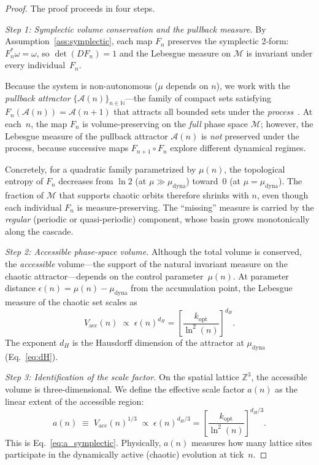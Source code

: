 \documentclass[twocolumn,showpacs,preprintnumbers,amsmath,amssymb,prd]{revtex4-2}
\newcommand{\lnq}{\ln^2}
\newcommand{\ZZ}{\mathbb{Z}}
\newcommand{\NN}{\mathbb{N}}
\begin{document}
\begin{proof}
The proof proceeds in four steps.

\emph{Step 1: Symplectic volume conservation and the pullback measure.}
By Assumption~\ref{ass:symplectic}, each map $F_n$
preserves the symplectic 2-form: $F_n^*\omega = \omega$,
so $\det(DF_n) = 1$ and the Lebesgue measure on $\mathcal{M}$
is invariant under every individual~$F_n$.

Because the system is non-autonomous ($\mu$ depends on $n$),
we work with the \emph{pullback attractor}
$\{\mathcal{A}(n)\}_{n\in\NN}$---the family of compact sets
satisfying $F_n(\mathcal{A}(n)) = \mathcal{A}(n+1)$
that attracts all bounded sets under the
\emph{process}~\cite{Kloeden2011}.
At each~$n$, the map $F_n$ is volume-preserving on the
\emph{full} phase space $\mathcal{M}$; however, the Lebesgue
measure of the pullback attractor $\mathcal{A}(n)$ is
\emph{not} preserved under the process, because successive
maps $F_{n+1}\circ F_n$ explore different dynamical regimes.

Concretely, for a quadratic family parametrized by $\mu(n)$,
the topological entropy of $F_n$ decreases from $\ln 2$
(at $\mu \gg \mu_{\mathrm{dyna}}$) toward~$0$
(at $\mu = \mu_{\mathrm{dyna}}$).
The fraction of $\mathcal{M}$ that supports chaotic orbits
therefore shrinks with $n$, even though each individual $F_n$
is measure-preserving.
The ``missing'' measure is carried by the \emph{regular}
(periodic or quasi-periodic) component, whose basin grows
monotonically along the cascade.

\emph{Step 2: Accessible phase-space volume.}
Although the total volume is conserved, the \emph{accessible}
volume---the support of the natural invariant measure on the
chaotic attractor---depends on the control parameter~$\mu(n)$.
At parameter distance $\epsilon(n) = \mu(n) - \mu_{\mathrm{dyna}}$
from the accumulation point, the Lebesgue measure of the
chaotic set scales as~\cite{Feigenbaum1978}
\begin{equation}
  V_{\mathrm{acc}}(n) \;\propto\;
  \epsilon(n)^{d_H}
  = \left[\frac{k_{\mathrm{opt}}}{\lnq(n)}\right]^{d_H}.
  \label{eq:Vacc}
\end{equation}
The exponent $d_H$ is the Hausdorff dimension of the attractor
at $\mu_{\mathrm{dyna}}$ (Eq.~\eqref{eq:dH}).

\emph{Step 3: Identification of the scale factor.}
On the spatial lattice $\ZZ^3$, the accessible volume is
three-dimensional.
We define the effective scale factor $a(n)$ as the linear extent
of the accessible region:
\begin{equation}
  a(n) \;\equiv\; V_{\mathrm{acc}}(n)^{1/3}
  \;\propto\; \epsilon(n)^{d_H/3}
  = \left[\frac{k_{\mathrm{opt}}}{\lnq(n)}\right]^{d_H/3}.
  \label{eq:a_def}
\end{equation}
This is Eq.~\eqref{eq:a_symplectic}.
Physically, $a(n)$ measures how many lattice sites participate
in the dynamically active (chaotic) evolution at tick~$n$.


\end{proof}
\end{document}
